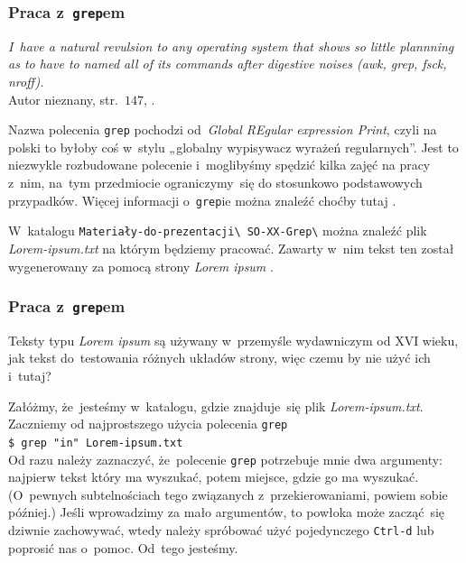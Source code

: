 \documentclass[10pt,t]{beamer}
\begin{document}
\begin{frame}
  \frametitle{Praca z~\texttt{grep}em}


  \textit{I~have a natural revulsion to any operating system that shows so
    little plannning as to have to named all of its commands after digestive
    noises (awk, grep, fsck, nroff).} \\
    Autor nieznany, str.~$147$,
    \parencite{Garfinkel-Weise-Strassmann-The-UNIX-HATERS-Handbook-Pub-1994}.

  Nazwa polecenia \texttt{grep} pochodzi od~\textit{Global REgular
    expression Print}, czyli na polski to byłoby coś w~stylu „globalny
  wypisywacz wyrażeń regularnych”. Jest to niezwykle rozbudowane polecenie
  i~moglibyśmy spędzić kilka zajęć na pracy z~nim, na~tym przedmiocie
  ograniczymy~się do stosunkowo podstawowych przypadków. Więcej informacji
  o~\texttt{grep}ie można znaleźć choćby tutaj
  \parencite{Pankaj-Wailia-Mastering-Grep-command-in-Linux-Unix-ETC-Ver-2025}.

  W~katalogu \texttt{Materiały-do-prezentacji\textbackslash
    SO-XX-Grep\textbackslash} można znaleźć plik \textit{Lorem-ipsum.txt}
  na którym będziemy pracować. Zawarty w~nim tekst ten został wygenerowany
  za pomocą strony \textit{Lorem ipsum}
  .

\end{frame}





\begin{frame}
  \frametitle{Praca z~\texttt{grep}em}

  Teksty typu \textit{Lorem ipsum} są używany w~przemyśle wydawniczym od
  XVI wieku, jak tekst do~testowania różnych układów strony, więc czemu by
  nie użyć ich i~tutaj?

  Załóżmy, że~jesteśmy w~katalogu, gdzie znajduje~się plik
  \textit{Lorem-ipsum.txt}. Zaczniemy od najprostszego użycia polecenia
  \texttt{grep} \\
  \texttt{\$ grep "in"{} Lorem-ipsum.txt} \\
  Od razu należy zaznaczyć, że~polecenie \texttt{grep} potrzebuje mnie dwa
  argumenty: najpierw tekst który ma wyszukać, potem miejsce, gdzie go ma
  wyszukać. (O~pewnych subtelnościach tego związanych z~przekierowaniami,
  powiem sobie później.) Jeśli wprowadzimy za mało argumentów, to powłoka
  może zacząć~się dziwnie zachowywać, wtedy należy spróbować użyć
  pojedynczego \texttt{Ctrl-d} lub poprosić nas o~pomoc. Od~tego jesteśmy.

\end{frame}
\end{document}
